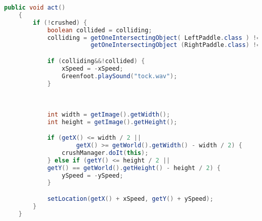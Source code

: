 \documentclass{pi1}
\begin{document}
\begin{lstlisting}[caption={act() Methode der Klasse Ball}, firstnumber=66, language=Java]
public void act() 
    {
        if (!crushed) {
            boolean collided = colliding;
            colliding = getOneIntersectingObject( LeftPaddle.class ) != null || 
                        getOneIntersectingObject (RightPaddle.class) != null;

            if (colliding&&!collided) {
                xSpeed = -xSpeed;
                Greenfoot.playSound("tock.wav");
            }

            
            
            int width = getImage().getWidth();
            int height = getImage().getHeight();

            if (getX() <= width / 2 ||
                    getX() >= getWorld().getWidth() - width / 2) {
                crushManager.doIt(this);
            } else if (getY() <= height / 2 ||
            getY() == getWorld().getHeight() - height / 2) {
                ySpeed = -ySpeed;
            }

            setLocation(getX() + xSpeed, getY() + ySpeed);
        }
    }
\end{lstlisting}
\end{document}
